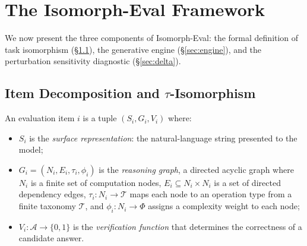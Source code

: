 % 
%

\section{The Isomorph-Eval Framework}
\label{sec:framework}

We now present the three components of Isomorph-Eval: the formal
definition of task isomorphism (\S\ref{sec:isomorphism}), the
generative engine (\S\ref{sec:engine}), and the perturbation sensitivity diagnostic
(\S\ref{sec:delta}).

\subsection{Item Decomposition and $\tau$-Isomorphism}
\label{sec:isomorphism}

\begin{definition}
\label{def:decomposition}
An evaluation item $i$ is a tuple $(S_i, G_i, V_i)$ where:
\begin{itemize}[nosep, leftmargin=*]
\item $S_i$ is the \emph{surface representation}: the natural-language
  string presented to the model;
\item $G_i = (N_i, E_i, \tau_i, \phi_i)$ is the \emph{reasoning graph},
  a directed acyclic graph where $N_i$ is a finite set of computation
  nodes, $E_i \subseteq N_i \times N_i$ is a set of directed dependency
  edges, $\tau_i : N_i \to \mathcal{T}$ maps each node to an operation
  type from a finite taxonomy $\mathcal{T}$, and
  $\phi_i : N_i \to \Phi$ assigns a complexity weight to each node;
\item $V_i : \mathcal{A} \to \{0, 1\}$ is the \emph{verification
  function} that determines the correctness of a candidate answer.
\end{itemize}
\end{definition}

